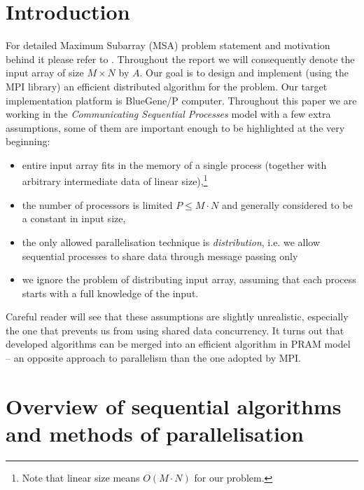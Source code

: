 




\section*{Introduction}

For detailed Maximum Subarray (MSA) problem statement and motivation behind it please refer to \cite{Pearls}.
Throughout the report we  will consequently denote the input array of size $M \times N$ by $A$.
Our goal is to design and implement (using the MPI library) an efficient distributed algorithm for the problem.
Our target implementation platform is BlueGene/P computer.
Throughout this paper we are working in the \emph{Communicating Sequential Processes} model with a few extra assumptions, some of them are important enough to be highlighted at the very beginning:
\begin{itemize}
    \item entire input array fits in the memory of a single process (together with arbitrary intermediate data of linear size),\footnote{Note that linear size means $O(M \cdot N)$ for our problem.}
    \item the number of processors is limited $P \leq M \cdot N$ and generally considered to be a constant in input size,
    \item the only allowed parallelisation technique is \emph{distribution}, i.e. we allow sequential processes to share data through message passing only
    \item we ignore the problem of distributing input array, assuming that each process starts with a full knowledge of the input.
\end{itemize}

Careful reader will see that these assumptions are slightly unrealistic, especially the one that prevents us from using shared data concurrency.
It turns out that developed algorithms can be merged into an efficient algorithm in PRAM model -- an opposite approach to parallelism than the one adopted by MPI.

\section*{Overview of sequential algorithms and methods of parallelisation}

